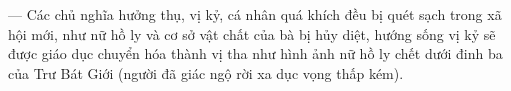 — Các chủ nghĩa hưởng thụ, vị kỷ, cá nhân quá khích đều bị quét sạch trong xã hội mới, như nữ hồ ly và cơ sở vật chất của bà bị hủy diệt, hướng sống vị kỷ sẽ được giáo dục chuyển hóa thành vị tha như hình ảnh nữ hồ ly chết dưới đinh ba của Trư Bát Giới (người đã giác ngộ rời xa dục vọng thấp kém).
